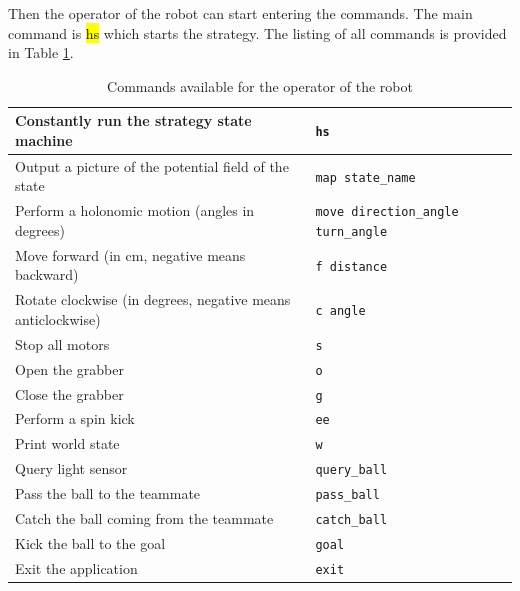 \documentclass[a4paper,12pt]{article}
\newcommand{\hg}[1]{\hl{\ttfamily #1}}
\begin{document}
Then the operator of the robot can start entering the commands. The main command is \hg{hs} which starts the strategy. The listing of all commands is provided in Table \ref{tab:commands}.

\begin{table}[h!]
\centering
\begin{tabular}{ | p{9cm} | p{6.2cm} | }
    \hline
    Constantly run the strategy state machine &
    \small{\texttt{hs}} \\ \hline
    Output a picture of the potential field of the state &
    \small{\texttt{map state\_name}} \\ \hline
    Perform a holonomic motion (angles in degrees) &
    \small{\texttt{move direction\_angle turn\_angle}} \\ \hline
    Move forward (in cm, negative means backward) &
    \small{\texttt{f distance}} \\ \hline
    Rotate clockwise (in degrees, negative means anticlockwise) &
    \small{\texttt{c angle}} \\ \hline
    Stop all motors &
    \small{\texttt{s}} \\ \hline
    Open the grabber &
    \small{\texttt{o}} \\ \hline
    Close the grabber &
    \small{\texttt{g}} \\ \hline
    Perform a spin kick &
    \small{\texttt{ee}} \\ \hline
    Print world state &
    \small{\texttt{w}} \\ \hline
    Query light sensor &
    \small{\texttt{query\_ball}} \\ \hline
    Pass the ball to the teammate &
    \small{\texttt{pass\_ball}} \\ \hline
    Catch the ball coming from the teammate &
    \small{\texttt{catch\_ball}} \\ \hline
    Kick the ball to the goal &
    \small{\texttt{goal}} \\ \hline
    Exit the application &
    \small{\texttt{exit}} \\ \hline
\end{tabular}
\caption{Commands available for the operator of the robot}
\label{tab:commands}
\end{table}
\end{document}
